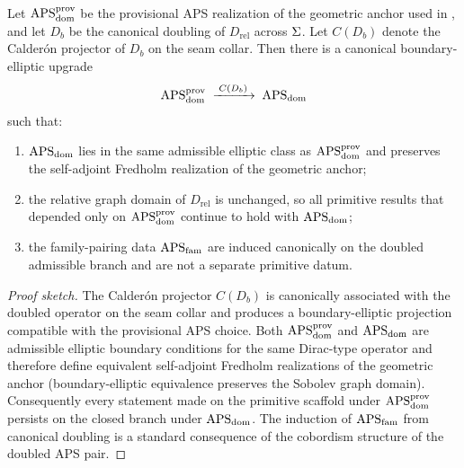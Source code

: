 \begin{theorem}
\label{thm:apsdom-upgrade}
Let $\mathrm{APS}_{\mathrm{dom}}^{\mathrm{prov}}$ be the provisional APS realization of the geometric anchor used in
, and let $D_b$ be the canonical doubling of
$D_{\mathrm{rel}}$ across $\Sigma$. Let $C(D_b)$ denote the Calder\'on projector of $D_b$ on the
seam collar. Then there is a canonical boundary-elliptic upgrade
\[
\mathrm{APS}_{\mathrm{dom}}^{\mathrm{prov}}
\;\xrightarrow{\;C(D_b)\;}\;
\mathrm{APS}_{\mathrm{dom}}
\]
such that:
\begin{enumerate}[label=(\roman*), leftmargin=1.5em, topsep=3pt, itemsep=2pt]
    \item $\mathrm{APS}_{\mathrm{dom}}$ lies in the same admissible elliptic class as $\mathrm{APS}_{\mathrm{dom}}^{\mathrm{prov}}$ and preserves the
    self-adjoint Fredholm realization of the geometric anchor;
    \item the relative graph domain of $D_{\mathrm{rel}}$ is unchanged, so all primitive results
    that depended only on $\mathrm{APS}_{\mathrm{dom}}^{\mathrm{prov}}$ continue to hold with $\mathrm{APS}_{\mathrm{dom}}$;
    \item the family-pairing data $\mathrm{APS}_{\mathrm{fam}}$ are induced canonically on the doubled admissible
    branch and are not a separate primitive datum.
\end{enumerate}
\end{theorem}

\begin{proof}[Proof sketch]
The Calder\'on projector $C(D_b)$ is canonically associated with the doubled operator on the
seam collar and produces a boundary-elliptic projection compatible with the provisional APS
choice. Both $\mathrm{APS}_{\mathrm{dom}}^{\mathrm{prov}}$ and $\mathrm{APS}_{\mathrm{dom}}$ are admissible elliptic boundary conditions for the
same Dirac-type operator and therefore define equivalent self-adjoint Fredholm realizations of
the geometric anchor (boundary-elliptic equivalence preserves the Sobolev graph domain).
Consequently every statement made on the primitive scaffold under $\mathrm{APS}_{\mathrm{dom}}^{\mathrm{prov}}$ persists on the
closed branch under $\mathrm{APS}_{\mathrm{dom}}$. The induction of $\mathrm{APS}_{\mathrm{fam}}$ from canonical doubling is a standard
consequence of the cobordism structure of the doubled APS pair.
\end{proof}

